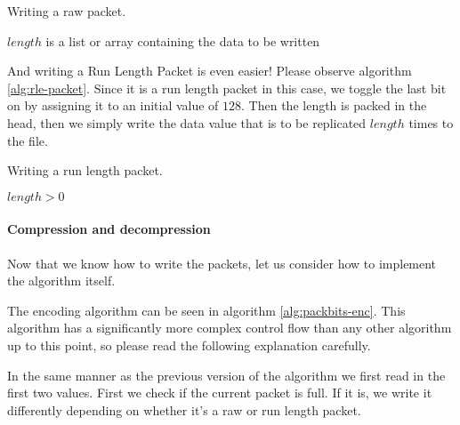 \begin{refsection}
\begin{algorithm}[h]
  \caption{Writing a raw packet.}
  \label{alg:raw-packet}
  \begin{algorithmic}[1]
    \Require $length$ is a list or array containing the data to be written
      \State {}
        \State {}
      \EndForEach
    \EndFunction
  \end{algorithmic}
\end{algorithm}

And writing a Run Length Packet is even easier! Please observe
algorithm \ref{alg:rle-packet}. Since it is a run length packet in
this case, we toggle the last bit on by assigning it to an initial
value of $128$. Then the length is packed in the head, then we simply
write the data value that is to be replicated $length$ times to the
file.

\begin{algorithm}[h]
  \caption{Writing a run length packet.}
  \label{alg:rle-packet}
  \begin{algorithmic}[1]
    \Require $length > 0$
      \State {}
      \State {}
    \EndFunction
  \end{algorithmic}
\end{algorithm}

\paragraph{Compression and decompression}
\label{sec:compr-decompr}

Now that we know how to write the packets, let us consider how to
implement the algorithm itself.

The encoding algorithm can be seen in algorithm
\ref{alg:packbits-enc}. This algorithm has a significantly more
complex control flow than any other algorithm up to this point, so please
read the following explanation carefully.

In the same manner as the previous version of the algorithm we first
read in the first two values. First we check if the current packet is
full. If it is, we write it differently depending on whether it's a
raw or run length packet.


\end{refsection}
